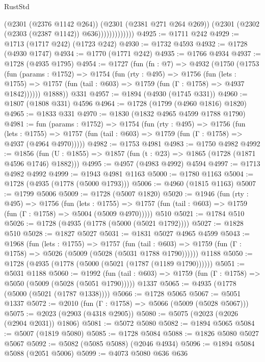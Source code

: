 \begin{lexlean}{RustStd}
\begin{coremodule}
                          (@2301 (@2376 @1142 @264))
                          (@2301 (@2381 @271 @264 @269))
                          (@2301 (@2302 (@2303 (@2387 @1142)) @636)))))))))))))
@4925 := @1711 @242
@4929 := @1713 (@1717 @242) (@1723 @242)
@4930 := @1732 @4593
@4932 := @1728 (@4930 @1747)
@4934 := @1770 (@1771 @242)
@4935 := @1766 @4934
@4937 := @1728 (@4935 @1795)
@4954 := @1727
    (fun (fn : @7) =>
    @4932
      (@1750
        (@1753
          (fun (params : @1752) =>
          @1754
            (fun (rty : @495) =>
            @1756
              (fun (lets : @1755) =>
              @1757 (fun (tail : @603) => @1759 (fun (Γ : @1758) => @4937 @1842))))))
        @1888))
    @331
@4957 := @1894 (@4930 (@1745 @331))
@4960 := @1807 (@1808 @331) @4596
@4964 := @1728 (@1799 (@4960 @1816) @1820)
@4965 := @1833 @331
@4970 := @1830 (@1832 @4965 @4599 @1788 @1790)
@4981 := fun (params : @1752) =>
  @1754
    (fun (rty : @495) =>
    @1756
      (fun (lets : @1755) =>
      @1757 (fun (tail : @603) => @1759 (fun (Γ : @1758) => @4937 (@4964 @4970)))))
@4982 := @1753 @4981
@4983 := @1750 @4982
@4992 := @1856 (fun (U : @1855) => @1857 (fun (t : @23) => @1865 (@1728 (@1871 @4596 @1746) @1882)))
@4995 := @4957 (@4983 @4992) @4594
@4997 := @1713 @4982 @4992
@4999 := @1943 @4981 @1163
@5000 := @1780 @1163
@5004 := @1728 (@4935 (@1778 (@5000 @1793)))
@5006 := @4960 (@1815 @1163)
@5007 := @1799 @5006
@5009 := @1728 (@5007 @1820)
@5020 := @1946
    (fun (rty : @495) =>
    @1756
      (fun (lets : @1755) =>
      @1757 (fun (tail : @603) => @1759 (fun (Γ : @1758) => @5004 (@5009 @4970)))))
    @510
@5021 := @1784 @510
@5026 := @1728 (@4935 (@1778 (@5000 (@5021 @1792))))
@5027 := @1828 @510
@5028 := @1827 @5027
@5031 := @1831 @5027 @4965 @4599
@5043 := @1968
    (fun (lets : @1755) =>
    @1757
      (fun (tail : @603) => @1759 (fun (Γ : @1758) => @5026 (@5009 (@5028 (@5031 @1788 @1790))))))
    @1188
@5050 := @1728 (@4935 (@1778 (@5000 (@5021 (@1787 (@1189 @1790))))))
@5051 := @5031 @1188
@5060 := @1992
    (fun (tail : @603) => @1759 (fun (Γ : @1758) => @5050 (@5009 (@5028 (@5051 @1790)))))
    @1337
@5065 := @4935 (@1778 (@5000 (@5021 (@1787 @1338))))
@5066 := @1728 @5065
@5067 := @5051 @1337
@5072 := @2010 (fun (Γ : @1758) => @5066 (@5009 (@5028 @5067)))
@5075 := @2023 (@2903 (@4318 @2905))
@5080 := @5075 (@2023 (@2026 (@2904 @2031)) @1806)
@5081 := @5072 @5080
@5082 := @1894 @5065
@5084 := @5007 (@1819 @5080)
@5085 := @1728 @5084
@5088 := @1826 @5080 @5027 @5067
@5092 := @5082 (@5085 @5088) (@2046 @4934)
@5096 := @1894 @5084 @5088 (@2051 @5006)
@5099 := @4073 @5080 @636 @636

\end{coremodule}
\end{lexlean}
